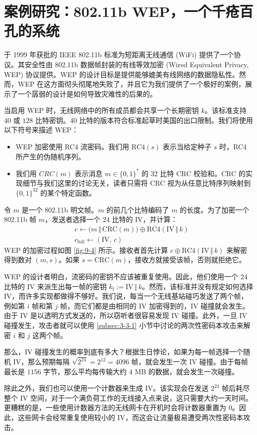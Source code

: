 \section{案例研究：802.11b WEP，一个千疮百孔的系统}\label{sec:9-10}

于 1999 年获批的 IEEE 802.11b 标准为短距离无线通信 (WiFi) 提供了一个协议。其安全性由 802.11b 数据帧封装的有线等效加密 (Wired Equivalent Privacy, WEP) 协议提供。WEP 的设计目标是提供能够媲美有线网络的数据隐私性。然而，WEP 在这方面彻头彻尾地失败了，并且它为我们提供了一个极好的案例，展示了一个孱弱的设计是如何导致灾难性的后果的。

当启用 WEP 时，无线网络中的所有成员都会共享一个长期密钥 $k$。该标准支持 $40$ 或 $128$ 比特密钥。$40$ 比特的版本符合标准起草时美国的出口限制。我们将使用以下符号来描述 WEP：
\begin{itemize}
	\item WEP 加密使用 RC4 流密码。我们用 $\mathrm{RC4}(s)$ 表示当给定种子 $s$ 时，RC4 所产生的伪随机序列。
	\item 我们用 $CRC(m)$ 表示消息 $m\in\{0,1\}^*$ 的 $32$ 比特 CRC 校验和。CRC 的实现细节与我们这里的讨论无关，读者只需将 CRC 视为从任意比特序列映射到 $\{0,1\}^{32}$ 的某个特定函数。
\end{itemize}

令 $m$ 是一个 802.11b 明文帧。$m$ 的前几个比特编码了 $m$ 的长度。为了加密一个 802.11b 帧 $m$，发送者选择一个 $24$ 比特的 IV，并计算：
\[
\begin{aligned}
& c\leftarrow\big(m\,\Vert\,\mathrm{CRC}(m)\big)\oplus\mathrm{RC4}(\mathrm{IV}\,\Vert\,k)\\
& c_\mathrm{full}\leftarrow(\mathrm{IV},\,c)
\end{aligned}
\]
WEP 的加密过程如图 \ref{fig:9-4} 所示。接收者首先计算 $c\oplus\mathrm{RC4}(\mathrm{IV}\,\Vert\,k)$ 来解密得到数对 $(m,s)$。如果 $s=\mathrm{CRC}(m)$，接收方就接受该帧，否则就拒绝它。

\begin{snote}[攻击 1：IV 碰撞。]
WEP 的设计者明白，流密码的密钥不应该被重复使用。因此，他们使用一个 $24$ 比特的 IV 来派生出每一帧的密钥 $k_\mathrm{f}:=\mathrm{IV}\,\Vert\,k$。然而，该标准并没有规定如何选择 IV，而许多实现都做得不够好。我们说，每当一个无线基站碰巧发送了两个帧，例如第 $i$ 帧和第 $j$ 帧，而它们都是由相同的 IV 加密得到的，IV 碰撞就会发生。由于 IV 是以透明方式发送的，所以窃听者很容易发现 IV 碰撞。此外，一旦 IV 碰撞发生，攻击者就可以使用 \ref{subsec:3-3-1} 小节中讨论的两次性密码本攻击来解密 $i$ 和 $j$ 这两个帧。

那么，IV 碰撞发生的概率到底有多大？根据生日悖论，如果为每一帧选择一个随机 IV，那么预期每隔 $\sqrt{2^{24}}=2^{12}=4096$ 帧，就会发生一次 IV 碰撞。由于每帧最长是 $1156$ 字节，那么平均每传输大约 4 MB 的数据，就会发生一次碰撞。

除此之外，我们也可以使用一个计数器来生成 IV。该实现会在发送 $2^{24}$ 帧后耗尽整个 IV 空间，对于一个满负荷工作的无线接入点来说，这只需要大约一天时间。更糟糕的是，一些使用计数器方法的无线网卡在开机时会将计数器重置为 $0$。因此，这些网卡会经常重复使用较小的 IV，而这会让流量极易遭受两次性密码本攻击。
\end{snote}

